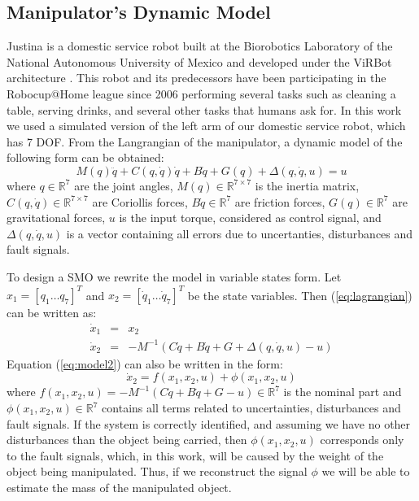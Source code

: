 \documentclass[conference,letterpaper]{ieeeconf}
\begin{document}
\subsection{Manipulator's Dynamic Model}

Justina is a domestic service robot built at the Biorobotics Laboratory of the National Autonomous University of Mexico and developed under the ViRBot architecture \cite{savage2008virbot}. This robot and its predecessors have been participating in the Robocup@Home league \cite{wachsmuth2015robocup} since 2006 performing several tasks such as cleaning a table, serving drinks, and several other tasks that humans ask for. In this work we used a simulated version of the left arm of our domestic service robot, which has 7 DOF. From the Langrangian of the manipulator, a dynamic model of the following form can be obtained:
  \begin{equation}
    M(q)\ddot{q} + C(q, \dot{q})\dot{q} + B\dot{q} + G(q) + \Delta(q,\dot{q}, u) = u
    \label{eq:lagrangian}
  \end{equation}
  where $q\in \mathbb{R}^7$ are the joint angles, $M(q)\in \mathbb{R}^{7\times 7}$ is the inertia matrix, $C(q,\dot{q})\in \mathbb{R}^{7\times 7}$ are Coriollis forces, $B\dot{q}\in \mathbb{R}^7$ are friction forces, $G(q)\in\mathbb{R}^7$ are gravitational forces, $u$ is the input torque, considered as control signal, and $\Delta(q,\dot{q},u)$ is a vector containing all errors due to uncertanties, disturbances and fault signals.
  
  To design a SMO we rewrite the model in variable states form. Let $x_1 = [q_1\dots q_7]^T$ and $x_2 = [\dot{q}_1 \dots \dot{q}_7]^T$ be the state variables. Then (\ref{eq:lagrangian}) can be written as:
  \begin{eqnarray}
    \dot{x}_1 &=& x_2\label{eq:model1}\\
    \dot{x}_2 &=& -M^{-1}\left(C\dot{q} + B\dot{q} + G + \Delta(q,\dot{q},u) - u\right)\label{eq:model2}
  \end{eqnarray}
Equation (\ref{eq:model2}) can also be written in the form:
  \begin{equation*}
    \dot{x}_2 = f(x_1, x_2, u) + \phi(x_1, x_2, u)
  \end{equation*}
  where $f(x_1, x_2, u) = -M^{-1}\left(C\dot{q} + B\dot{q} + G - u\right) \in \mathbb{R}^7$ is the nominal part and $\phi(x_1, x_2, u) \in \mathbb{R}^7$ contains all terms related to uncertainties, disturbances and fault signals. If the system is correctly identified, and assuming we have no other disturbances than the object being carried, then $\phi(x_1, x_2, u)$ corresponds only to the fault signals, which, in this work, will be caused by the weight of the object being manipulated. Thus, if we reconstruct the signal $\phi$ we will be able to estimate the mass of the manipulated object. 
\end{document}
